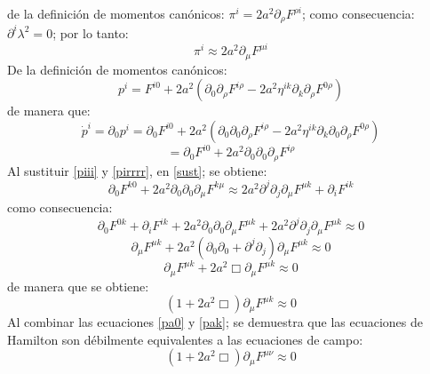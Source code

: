 \documentclass[a4paper,12pt]{article}
\begin{document}
de la definición de momentos canónicos: $\pi^i=2a^2\partial_\rho F^{\rho i}$; como consecuencia: $\partial^i\lambda^2=0$; por lo tanto:
\begin{equation}
\pi^i\approx2a^2\partial_\mu F^{\mu i} 
\label{piii}
\end{equation}
De la definición de momentos canónicos:  
\begin{equation}
p^i=F^{i0}+2a^2(\partial_0\partial_\rho F^{i\rho}-2a^2\eta^{ik}\partial_k\partial_\rho F^{0\rho}) 
\end{equation}
de manera que:
\begin{equation}
\dot{p}^i=\partial_0p^i=\partial_0F^{i0}+2a^2(\partial_0\partial_0\partial_\rho F^{i\rho}-2a^2\eta^{ik}\partial_k\partial_0\partial_\rho F^{0\rho}) 
\label{pirrrr}
\end{equation}
$$=\partial_0F^{i0}+2a^2\partial_0\partial_0\partial_\rho F^{i\rho}$$
Al sustituir \eqref{piii} y \eqref{pirrrr}, en \eqref{sust}; se obtiene:
\vspace{0,4cm}
\begin{equation}
\partial_0F^{k0}+2a^2\partial_0\partial_0\partial_\mu F^{k\mu}\approx2a^2\partial^j\partial_j\partial_\mu F^{\mu k}+\partial_iF^{ik} 
\end{equation}
como consecuencia:
\begin{equation}
\partial_0F^{0k}+\partial_iF^{ik}+2a^2\partial_0\partial_0\partial_\mu F^{\mu k}+2a^2\partial^j\partial_j\partial_\mu F^{\mu k}\approx0 
\end{equation}
$$\partial_\mu F^{\mu k}+2a^2(\partial_0\partial_0+\partial^j\partial_j)\partial_\mu F^{\mu k}\approx0$$
$$\partial_\mu F^{\mu k}+2a^2\Box\partial_\mu F^{\mu k}\approx0$$
de manera que se obtiene:
\begin{equation}
(1+2a^2\Box)\partial_\mu F^{\mu k}\approx0
\label{pak}
\end{equation}
Al combinar las ecuaciones \eqref{pa0} y \eqref{pak}; se demuestra que las ecuaciones de Hamilton son débilmente equivalentes a las ecuaciones de campo:
\begin{equation}
(1+2a^2\Box)\partial_\mu F^{\mu \nu}\approx0
\end{equation}
\vspace{0,4cm}
 
\\
\end{document}

